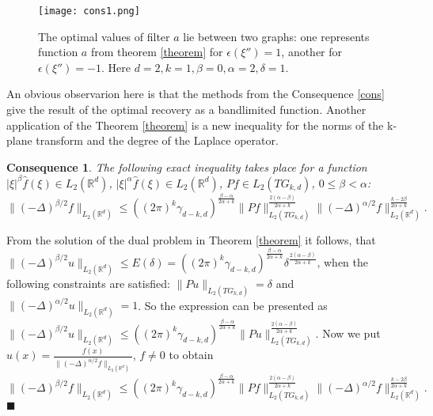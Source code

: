 \documentclass[12pt]{iopart}
\newtheorem{conseq}{Consequence}
\newenvironment{proof}
{\par\noindent{\bf Proof}}
{\hfill$\scriptstyle\blacksquare$}
\begin{document}
\begin{figure}[h]
\centering
\texttt{[image: cons1.png]}
\caption{The optimal values of filter $a$ lie between two graphs: one represents function $a$ from theorem \ref{theorem} for $\epsilon(\xi'')=1$, another for $\epsilon(\xi'')=-1$. Here $d=2, k=1, \beta=0, \alpha=2, \delta=1$.}
\label{pic1}
\end{figure}

An obvious observarion here is that the methods from the Consequence \ref{cons} give the result of the optimal recovery as a bandlimited function. Another application of the Theorem \ref{theorem} is a new inequality for the norms of the k-plane transform and the degree of the Laplace operator.


\begin{conseq}
\label{cons2}
The following exact inequality takes place for a function $|\xi|^\beta\widehat f(\xi)\in L_2(\mathbb R^d)$, $|\xi|^\alpha\widehat f(\xi)\in L_2(\mathbb R^d)$, $Pf\in L_2(TG_{k,d})$, $0\le\beta<\alpha$:
\[
\|(-\Delta)^{\beta/2}f\|_{L_2(\mathbb R^d)}\leqslant
((2\pi)^k\gamma_{d-k,d})^{\frac{\beta-\alpha}{2\alpha+k}}\|Pf\|_{L_2(TG_{k,d})}^{\frac{2(\alpha-\beta)}{2\alpha+k}}\|(-\Delta)^{\alpha/2}f\|_{L_2(\mathbb
  R^d)}^\frac{k-2\beta}{2\alpha+k}.
\]
\end{conseq}

\begin{proof}
From the solution of the dual problem in Theorem \ref{theorem} it follows, that \linebreak
 $\|(-\Delta)^{\beta/2}u\|_{L_2(\mathbb R^d)}\leqslant E(\delta)=
  ((2\pi)^k\gamma_{d-k,d})^{\frac{\beta-\alpha}{2\alpha+k}}\delta^{\frac{2(\alpha-\beta)}{2\alpha+k}}$, 
  when the following constraints are satisfied: $\|Pu\|_{L_2(TG_{k,d})}=\delta$ and
  $\|(-\Delta)^{\alpha/2}u\|_{L_2(\mathbb R^d)}=1$. So the expression can be presented as \linebreak
$\|(-\Delta)^{\beta/2}u\|_{L_2(\mathbb R^d)}\leqslant
  ((2\pi)^k\gamma_{d-k,d})^{\frac{\beta-\alpha}{2\alpha+k}}\|Pu\|_{L_2(TG_{k,d})}^{\frac{2(\alpha-\beta)}{2\alpha+k}}$.
 Now we put
 $u(x)=\frac{f(x)}{\|(-\Delta)^{\alpha/2}f\|_{L_2(\mathbb R^d)}}$, $f\ne 0$ to obtain
\[
\|(-\Delta)^{\beta/2}f\|_{L_2(\mathbb R^d)}\leqslant
((2\pi)^k\gamma_{d-k,d})^{\frac{\beta-\alpha}{2\alpha+k}}\|Pf\|_{L_2(TG_{k,d})}^{\frac{2(\alpha-\beta)}{2\alpha+k}}\|(-\Delta)^{\alpha/2}f\|_{L_2(\mathbb
  R^d)}^\frac{k-2\beta}{2\alpha+k}.
\]
\end{proof}
\end{document}
